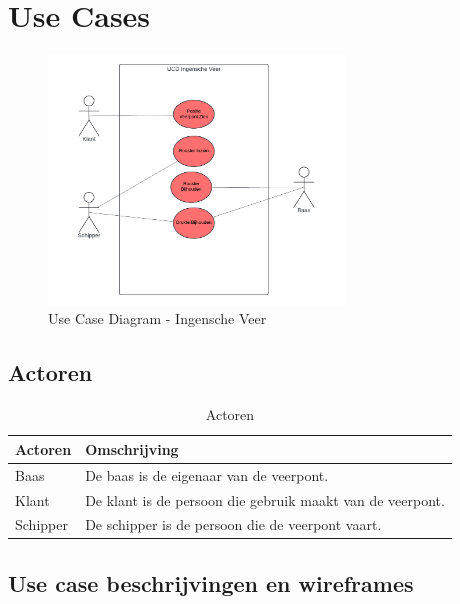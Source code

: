\documentclass{article}
\begin{document}
\section{Use Cases}
\begin{figure}[h]
    \centering
    \label{fig:ucd}
    \includegraphics[width=0.7\textwidth]{images/iv_ucd_color.png}
    \caption{Use Case Diagram - Ingensche Veer}
\end{figure}

\subsection{Actoren}

\begin{table}[h]
    \centering
    \begin{tabularx}{\textwidth}{|l|X|}
        \hline
        \textbf{Actoren} & \textbf{Omschrijving}  \\
        \hline
        Baas & De baas is de eigenaar van de veerpont. \\
        \hline
        Klant  & De klant is de persoon die gebruik maakt van de veerpont. \\
        \hline
        Schipper & De schipper is de persoon die de veerpont vaart. \\
        \hline

    \end{tabularx}
    \caption{Actoren}
\end{table}

\subsection{Use case beschrijvingen en wireframes}
\end{document}
